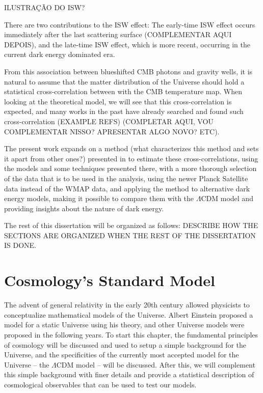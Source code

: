 \documentclass[openany,a4paper,12pt,oneside]{book}
\begin{document}
\begin{spacing}{1.5}
ILUSTRAÇÃO DO ISW?

There are two contributions to the ISW effect: The early-time ISW effect occurs immediately after the last scattering surface (COMPLEMENTAR AQUI DEPOIS), and the late-time ISW effect, which is more recent, occurring in the current dark energy dominated era. 

From this association between blueshifted CMB photons and gravity wells, it is natural to assume that the matter distribution of the Universe should hold a statistical cross-correlation between with the CMB temperature map. When looking at the theoretical model, we will see that this cross-correlation is expected, and many works in the past have already searched and found such cross-correlation (EXAMPLE REFS) (COMPLETAR AQUI, VOU COMPLEMENTAR NISSO? APRESENTAR ALGO NOVO? ETC). 

The present work expands on a method (what characterizes this method and sets it apart from other ones?) presented in \cite{Moura-Santos_2016} to estimate these cross-correlations, using the models and some techniques presented there, with a more thorough selection of the data that is to be used in the analysis, using the newer Planck Satellite data instead of the WMAP data, and applying the method to alternative dark energy models, making it possible to compare them with the $\Lambda $CDM model and providing insights about the nature of dark energy. 

The rest of this dissertation will be organized as follows: DESCRIBE HOW THE SECTIONS ARE ORGANIZED WHEN THE REST OF THE DISSERTATION IS DONE.

\chapter{Cosmology's Standard Model}

The advent of general relativity in the early 20th century allowed physicists to conceptualize mathematical models of the Universe. Albert Einstein proposed a model for a static Universe using his theory\cite{Einstein:1917ce}, and other Universe models were proposed in the following years. To start this chapter, the fundamental principles of cosmology will be discussed and used to setup a simple background for the Universe, and the specificities of the currently most accepted model for the Universe -- the $\Lambda$CDM model -- will be discussed. After this, we will complement this simple background with finer details and provide a statistical description of cosmological observables that can be used to test our models.


\end{spacing}
\end{document}
